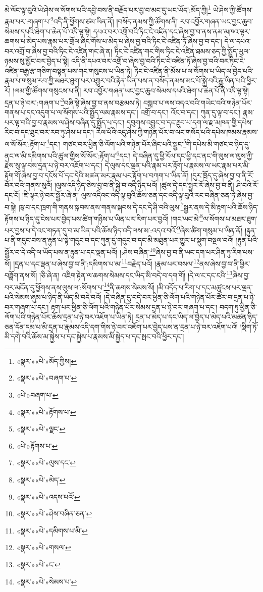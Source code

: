 མེ་ལོང་ལྟ་བུའི་ཡེ་ཤེས་ལ་སོགས་པའི་དབྱེ་བས་ནི་བརྗོད་པར་བྱ་བ་མང་དུ་ཡང་ཡོད་:མོད་ཀྱི།\footnote{«སྣར་»«པེ་»མོད་ཀྱིས།} ཡེ་ཤེས་ཀྱི་ཚོགས་རྣམ་པར་:གཞག་པ་\footnote{«སྣར་»«པེ་»བཞག་པ་}འདི་ནི་ཕྱོགས་ཙམ་ཡིན་ནོ། །བསོད་ནམས་ཀྱི་ཚོགས་ནི། རབ་འབྱོར་གཞན་ཡང་བྱང་ཆུབ་སེམས་དཔའི་ཐེག་པ་ཆེན་པོ་འདི་ལྟ་སྟེ། དཔའ་བར་འགྲོ་བའི་ཏིང་ངེ་འཛིན་དང་ཞེས་བྱ་བ་ནས་ནམ་མཁའ་ལྟར་ཆགས་པ་མེད་པས་རྣམ་པར་གྲོལ་ཞིང་གོས་པ་མེད་པ་ཞེས་བྱ་བའི་ཏིང་ངེ་འཛིན་ཏོ་ཞེས་བྱ་བ་དང་། དེ་ལ་དཔའ་བར་འགྲོ་བ་ཞེས་བྱ་བའི་ཏིང་ངེ་འཛིན་གང་ཞེ་ན། ཏིང་ངེ་འཛིན་གང་གིས་ཏིང་ངེ་འཛིན་ཐམས་ཅད་ཀྱི་སྤྱོད་ཡུལ་ཉམས་སུ་མྱོང་བར་བྱེད་པ་སྟེ། འདི་ནི་དཔའ་བར་འགྲོ་བ་ཞེས་བྱ་བའི་ཏིང་ངེ་འཛིན་ཏོ་ཞེས་བྱ་བའི་བར་ཏིང་ངེ་འཛིན་བརྒྱ་རྩ་གཅིག་བསྟན་པས་གང་གསུངས་པ་ཡིན་ཏེ། ཏིང་ངེ་འཛིན་ནི་མོས་པ་ལ་སོགས་པ་ཡིད་ལ་བྱེད་པའི་རྣམ་པ་གསུམ་རབ་ཀྱི་མཐར་ཐུག་པར་འགྱུར་བའི་རྟེན་ཡིན་པས་ན་བསོད་ནམས་མང་པོ་སྐྱེ་བའི་རྒྱུ་ཡིན་པའི་ཕྱིར་རོ། །ལམ་གྱི་ཚོགས་གསུངས་པ་ནི། རབ་འབྱོར་གཞན་ཡང་བྱང་ཆུབ་སེམས་དཔའི་ཐེག་པ་ཆེན་པོ་ནི་འདི་ལྟ་སྟེ། དྲན་པ་ཉེ་བར་:གཞག་པ་\footnote{«པེ་»བཞག་པ་}བཞི་སྟེ་ཞེས་བྱ་བ་ནས་བརྩམས་ཏེ། བསླབ་པ་ལས་འདའ་བའི་གཡེང་བའི་གཉེན་པོར་གནས་པ་དང་འདུག་པ་ལ་སོགས་པའི་སྤྱོད་ལམ་རྣམས་དང་། འགྲོ་བ་དང་། འོང་བ་དང་། ཀུན་དུ་ལྟ་བ་དང་། རྣམ་པར་ལྟ་བའི་བྱ་བ་རྣམས་ལ་ཤེས་བཞིན་དུ་སྤྱོད་པ་དང་། དབུགས་འབྱུང་བ་དང་རྔུབ་པ་དག་ལ་རྫ་མཁན་གྱི་དཔེས་རིང་བ་དང་ཐུང་བར་རབ་ཏུ་ཤེས་པ་དང་། རིལ་པོའི་འདུ་ཤེས་ཀྱི་གཉེན་པོར་བ་ལང་གསོད་པའི་དཔེས་ཁམས་རྣམས་ལ་སོ་སོར་:རྟོག་པ་\footnote{«སྣར་»«པེ་»རྟོགས་པ་}དང་། གཙང་བར་ཕྱིན་ཅི་ལོག་པའི་གཉེན་པོར་ཞིང་པའི་སྦྱང་\footnote{«སྣར་»«པེ་»ལྗང་}གི་དཔེས་མི་གཙང་བ་ཉིད་དུ་ནང་ལ་མི་དམིགས་པའི་ཚུལ་གྱིས་སོ་སོར་:རྟོག་པ་\footnote{«པེ་»རྟོགས་པ་}དང་། དེ་བཞིན་དུ་ཕྱི་རོལ་དང་ཕྱི་དང་ནང་གི་ལུས་ལ་ལུས་ཀྱི་རྗེས་སུ་ལྟ་བས་དྲན་པ་ཉེ་བར་འཇོག་པ་དང་། དེ་ལུས་དང་ལྡན་པའི་རྣམ་པར་རྟོག་པ་རྣམས་ལ་ཡང་རྣམ་པར་མི་རྟོག་གོ་ཞེས་བྱ་བ་དངོས་པོ་དང་དེའི་མཚན་མར་རྣམ་པར་རྟོག་པ་བཀག་པ་ཡིན་ནོ། །དུར་ཁྲོད་དུ་ཞེས་བྱ་བ་ནི་རོ་བོར་བའི་གནས་སུའོ། །ལུས་འདི་ཉིད་ཅེས་བྱ་བ་ནི་སྐྱེ་བ་འདི་ཉིད་པའོ། །ཚུལ་དེ་དང་སྦྱར་རོ་ཞེས་བྱ་བ་ནི། ཤི་བའི་རོ་དང་ངོ། །ཇི་ལྟར་ཉེ་བར་སྦྱོར་ཞེ་ན། ལུས་འདིའང་འདི་ལྟ་བུའི་ཆོས་ཅན་དང་འདི་ལྟ་བུའི་རང་བཞིན་ཅན་ཏེ་ཞེས་བྱ་བ་སྟེ། ཁུ་བ་དང་ཁྲག་གི་གནས་སྐབས་ནས་གནས་སྐབས་དེ་དང་དེ་ཤི་བའི་ལུས་\footnote{«སྣར་»«པེ་»ལུས་དང་}སྦྱར་ནས་དེ་མི་རྟག་པའི་ཆོས་ཉིད་རྟོགས་པ་ཉིད་དུ་ངེས་པར་བྱེད་པས་ཚིག་གཉིས་པ་ཡིན་པར་རིག་པར་བྱའོ། །གང་ཡང་མེ་\footnote{«སྣར་»«པེ་»མེད་}ལ་སོགས་པ་མཐར་ཐུག་པར་བྱས་པ་དེ་འང་གཏན་དུ་བ་མ་ཡིན་པའི་ཆོས་ཉིད་འདི་ལས་མ་:འདའ་བའོ་\footnote{«སྣར་»«པེ་»འདས་པའོ་}ཞེས་ཚིག་གསུམ་པ་ཡིན་ནོ། །རྟུན་པ་ནི་གདུང་བས་ན་རྟུན་པ་སྟེ་གདུང་བ་དང་ཀུན་དུ་གདུང་བ་དང་མི་མཐུན་པར་གྱུར་པ་སྡུག་བསྔལ་བའོ། །རྟུན་པའི་སྦྱོར་བ་དེ་འདི་ལ་ཡོད་པས་ན་རྟུན་པ་དང་ལྡན་པའོ། །:ཤེས་བཞིན་\footnote{«སྣར་»«པེ་»ཤེས་བཞིན་ཅན་}ཞེས་བྱ་བ་ནི་ཡང་དག་པར་ཤིན་ཏུ་རིག་པས་སོ། །དྲན་པ་དང་ལྡན་པ་ཞེས་བྱ་བ་ནི་:དམིགས་པ་མ་\footnote{«སྣར་»«པེ་»དམིགས་པ་མི་}བརྗེད་པའོ། །རྣམ་པར་བསལ་\footnote{«སྣར་»«པེ་»གསལ་}ནས་ཞེས་བྱ་བ་ནི་ཕྱིར་བཟློག་ནས་སོ། །ཅི་ཞེ་ན། འཇིག་རྟེན་ལ་ཆགས་སེམས་དང་ཡིད་མི་བདེ་བ་དག་གོ། །དེ་ལ་ང་དང་ངའི་\footnote{«སྣར་»«པེ་»ང་}ཞེས་བྱ་བར་མངོན་དུ་ཕྱོགས་ནས་ལུས་ལ་:སོགས་པ་\footnote{«སྣར་»«པེ་»སེམས་པ་}ནི་ཆགས་སེམས་སོ། །མི་འདོད་པ་རིག་པ་དང་མཚུངས་པར་ལྡན་པའི་སེམས་ཞུམ་པ་ཉིད་ནི་ཡིད་མི་བདེ་བའོ། །དེ་བཞིན་དུ་བདེ་བར་ཕྱིན་ཅི་ལོག་པའི་གཉེན་པོར་ཚོར་བ་དྲན་པ་ཉེ་བར་གཞག་པ་དང་། རྟག་པར་ཕྱིན་ཅི་ལོག་པའི་གཉེན་པོར་སེམས་དྲན་པ་ཉེ་བར་གཞག་པ་དང་། བདག་ཏུ་ཕྱིན་ཅི་ལོག་པའི་གཉེན་པོར་ཆོས་དྲན་པ་ཉེ་བར་འཇོག་པ་ཡིན་ཏེ། དྲན་པ་མེད་པ་དང་ཡིད་ལ་བྱེད་པ་མེད་པའི་མཚན་ཉིད་ཅན་དོན་དམ་པ་མི་དྲན་པ་རྣམས་འདི་དག་གིས་ཉེ་བར་འཇོག་པར་བྱེད་པས་ན་དྲན་པ་ཉེ་བར་འཇོག་པའོ། །སྡིག་ཏོ་མི་དགེ་བའི་ཆོས་མ་སྐྱེས་པ་དང་སྐྱེས་པ་རྣམས་མི་སྐྱེད་པ་དང་སྤང་བའི་ཕྱིར་དང་། 